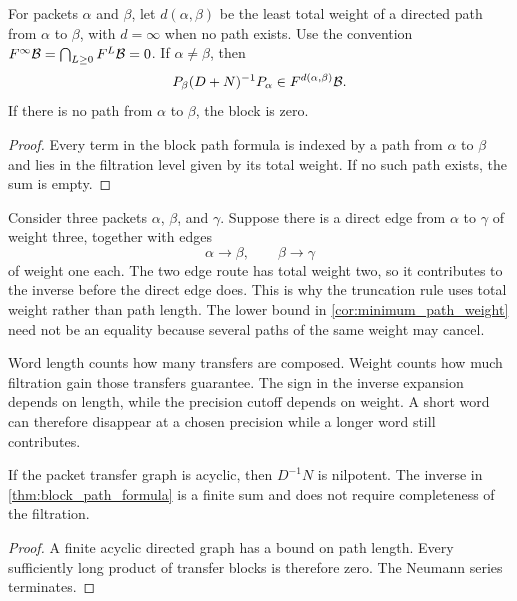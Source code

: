 \begin{corollary}\label{cor:minimum_path_weight}
For packets $\alpha$ and $\beta$, let $d(\alpha,\beta)$ be the least total weight of a directed path from $\alpha$ to $\beta$, with $d=\infty$ when no path exists.  Use the convention $F^\infty\mathcal B=\bigcap_{L\geq0}F^L\mathcal B=0$.  If $\alpha\ne\beta$, then
\[
P_\beta(D+N)^{-1}P_\alpha
\in
F^{d(\alpha,\beta)}\mathcal B.
\]
If there is no path from $\alpha$ to $\beta$, the block is zero.
\end{corollary}

\begin{proof}
Every term in the block path formula is indexed by a path from $\alpha$ to $\beta$ and lies in the filtration level given by its total weight.  If no such path exists, the sum is empty.
\end{proof}

\begin{example}\label{ex:weighted_route}
Consider three packets $\alpha$, $\beta$, and $\gamma$.  Suppose there is a direct edge from $\alpha$ to $\gamma$ of weight three, together with edges
\[
\alpha\longrightarrow\beta,
\qquad
\beta\longrightarrow\gamma
\]
of weight one each.  The two edge route has total weight two, so it contributes to the inverse before the direct edge does.  This is why the truncation rule uses total weight rather than path length. The lower bound in \cref{cor:minimum_path_weight} need not be an equality because several paths of the same weight may cancel.
\end{example}

\begin{keyidea}
Word length counts how many transfers are composed. Weight counts how much filtration gain those transfers guarantee. The sign in the inverse expansion depends on length, while the precision cutoff depends on weight. A short word can therefore disappear at a chosen precision while a longer word still contributes.
\end{keyidea}

\begin{corollary}\label{cor:acyclic_inverse}
If the packet transfer graph is acyclic, then $D^{-1}N$ is nilpotent.  The inverse in \cref{thm:block_path_formula} is a finite sum and does not require completeness of the filtration.
\end{corollary}

\begin{proof}
A finite acyclic directed graph has a bound on path length.  Every sufficiently long product of transfer blocks is therefore zero.  The Neumann series terminates.
\end{proof}

